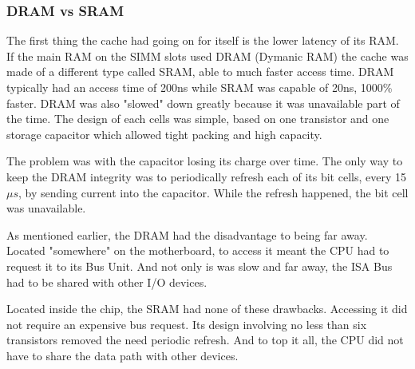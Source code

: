 \subsubsection{DRAM vs SRAM}
The first thing the cache had going on for itself is the lower latency of its RAM. If the main RAM on the SIMM slots used DRAM (Dymanic RAM) the cache was made of a different type called SRAM, able to much faster access time. DRAM typically had an access time of 200ns while SRAM was capable of 20ns, 1000\% faster. DRAM was also "slowed" down greatly because it was unavailable part of the time. The design of each cells was simple, based on one transistor and one storage capacitor which allowed tight packing and high capacity.\\
\par The problem was with the capacitor losing its charge over time. The only way to keep the DRAM integrity was to periodically refresh each of its bit cells, every 15$\mu s$, by sending current into the capacitor. While the refresh happened, the bit cell was unavailable.\\
\par
{}
As mentioned earlier, the DRAM had the disadvantage to being far away. Located "somewhere" on the motherboard, to access it meant the CPU had to request it to its Bus Unit. And not only is was slow and far away, the ISA Bus had to be shared with other I/O devices.\\
\par
\vspace{2mm}
\par
Located inside the chip, the SRAM had none of these drawbacks. Accessing it did not require an expensive bus request. Its design involving no less than six transistors removed the need periodic refresh. And to top it all, the CPU did not have to share the data path with other devices.
\par










